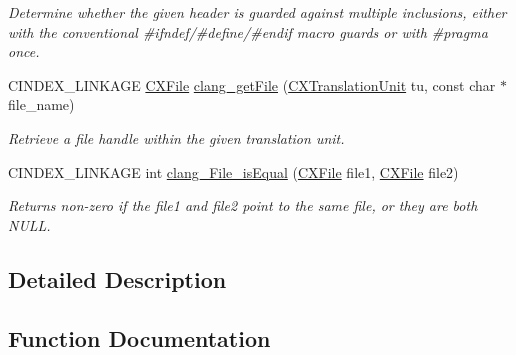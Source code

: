 \begin{DoxyCompactItemize}
\begin{DoxyCompactList}\small\item\em Determine whether the given header is guarded against multiple inclusions, either with the conventional \#ifndef/\#define/\#endif macro guards or with \#pragma once. \end{DoxyCompactList}\item 
C\+I\+N\+D\+E\+X\+\_\+\+L\+I\+N\+K\+A\+GE \mbox{\hyperlink{group__CINDEX__FILES_gacfcea9c1239c916597e2e5b3e109215a}{C\+X\+File}} \mbox{\hyperlink{group__CINDEX__FILES_gaa0554e2ea48ecd217a29314d3cbd2085}{clang\+\_\+get\+File}} (\mbox{\hyperlink{group__CINDEX_gacdb7815736ca709ce9a5e1ec2b7e16ac}{C\+X\+Translation\+Unit}} tu, const char $\ast$file\+\_\+name)
\begin{DoxyCompactList}\small\item\em Retrieve a file handle within the given translation unit. \end{DoxyCompactList}\item 
\mbox{\label{group__CINDEX__FILES_gab78e940d8990228d941a79750a7e4499}} 
C\+I\+N\+D\+E\+X\+\_\+\+L\+I\+N\+K\+A\+GE int \mbox{\hyperlink{group__CINDEX__FILES_gab78e940d8990228d941a79750a7e4499}{clang\+\_\+\+File\+\_\+is\+Equal}} (\mbox{\hyperlink{group__CINDEX__FILES_gacfcea9c1239c916597e2e5b3e109215a}{C\+X\+File}} file1, \mbox{\hyperlink{group__CINDEX__FILES_gacfcea9c1239c916597e2e5b3e109215a}{C\+X\+File}} file2)
\begin{DoxyCompactList}\small\item\em Returns non-\/zero if the {\ttfamily file1} and {\ttfamily file2} point to the same file, or they are both N\+U\+LL. \end{DoxyCompactList}\end{DoxyCompactItemize}


\subsection{Detailed Description}


\subsection{Function Documentation}
\mbox{\label{group__CINDEX__FILES_gaa0554e2ea48ecd217a29314d3cbd2085}} 
